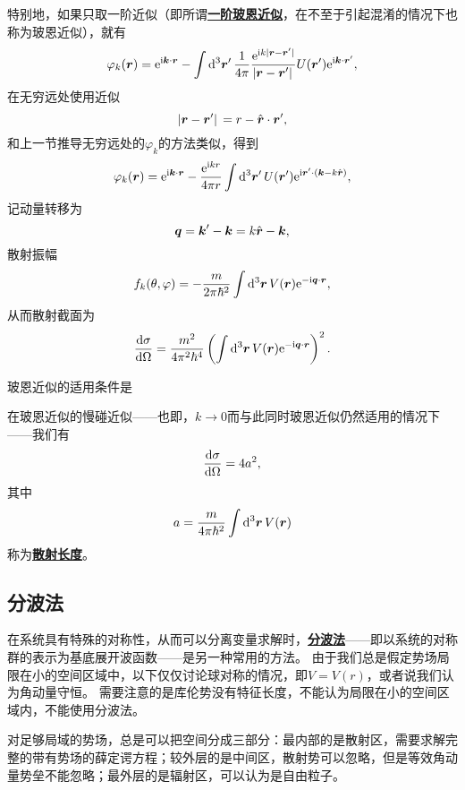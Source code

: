 \documentclass[UTF8, a4paper]{ctexart}
\newcommand*{\ee}{\mathrm{e}}
\newcommand*{\ii}{\mathrm{i}}
\newcommand{\concept}[1]{\underline{\textbf{#1}}}
\begin{document}
特别地，如果只取一阶近似（即所谓\concept{一阶玻恩近似}，在不至于引起混淆的情况下也称为玻恩近似），就有
\begin{equation}
    \varphi_k(\vb*{r}) = \ee^{\ii \vb*{k} \cdot \vb*{r}} - \int \dd[3]{\vb*{r}'} \frac{1}{4\pi} \frac{\ee^{\ii k \abs*{\vb*{r} - \vb*{r}'}}}{\abs*{\vb*{r} - \vb*{r}'}} U(\vb*{r}') \ee^{\ii \vb*{k} \cdot \vb*{r}'},
\end{equation}
在无穷远处使用近似
\[
    \abs*{\vb*{r}-\vb*{r}'} = r - \hat{\vb*{r}} \cdot \vb*{r}',
\]
和上一节推导无穷远处的$\varphi_k$的方法类似，得到
\[
    \varphi_k(\vb*{r}) = \ee^{\ii \vb*{k} \cdot \vb*{r}} - \frac{\ee^{\ii k r}}{4 \pi r} \int \dd[3]{\vb*{r}'} U(\vb*{r}') \ee^{\ii \vb*{r}' \cdot (\vb*{k} - k \hat{\vb*{r}})},
\]
记动量转移为
\begin{equation}
    \vb*{q} = \vb*{k}' - \vb*{k} = k \hat{\vb*{r}} - \vb*{k},
\end{equation}
散射振幅
\begin{equation}
    f_k(\theta, \varphi) = - \frac{m}{2\pi \hbar^2} \int \dd[3]{\vb*{r}} V(\vb*{r}) \ee^{- \ii \vb*{q} \cdot \vb*{r}}, 
\end{equation}
从而散射截面为
\begin{equation}
    \dv{\sigma}{\Omega} = \frac{m^2}{4\pi^2 \hbar^4} \left( \int \dd[3]{\vb*{r}} V(\vb*{r}) \ee^{- \ii \vb*{q} \cdot \vb*{r}} \right)^2.
\end{equation}

玻恩近似的适用条件是

在玻恩近似的慢碰近似——也即，$k \to 0$而与此同时玻恩近似仍然适用的情况下——我们有
\begin{equation}
    \dv{\sigma}{\Omega} = 4 a^2,
\end{equation}
其中
\begin{equation}
    a = \frac{m}{4\pi \hbar^2} \int \dd[3]{\vb*{r}} V(\vb*{r})
\end{equation}
称为\concept{散射长度}。

\subsection{分波法}

在系统具有特殊的对称性，从而可以分离变量求解时，\concept{分波法}——即以系统的对称群的表示为基底展开波函数——是另一种常用的方法。
由于我们总是假定势场局限在小的空间区域中，以下仅仅讨论球对称的情况，即$V = V(r)$，或者说我们认为角动量守恒。
需要注意的是库伦势没有特征长度，不能认为局限在小的空间区域内，不能使用分波法。

对足够局域的势场，总是可以把空间分成三部分：最内部的是散射区，需要求解完整的带有势场的薛定谔方程；较外层的是中间区，散射势可以忽略，但是等效角动量势垒不能忽略；最外层的是辐射区，可以认为是自由粒子。
\end{document}
